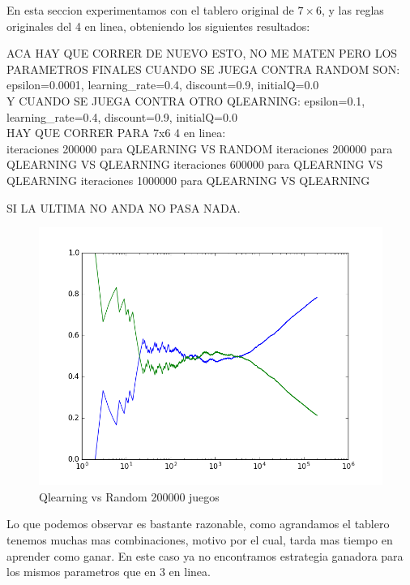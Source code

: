En esta seccion experimentamos con el tablero original de $7\times6$, y las reglas originales del 4 en linea, obteniendo los siguientes resultados:\\

{\large ACA HAY QUE CORRER DE NUEVO ESTO, NO ME MATEN PERO LOS PARAMETROS FINALES 
CUANDO SE JUEGA CONTRA RANDOM SON: \\
epsilon=0.0001, learning\_rate=0.4, discount=0.9, initialQ=0.0 \\
Y CUANDO SE JUEGA CONTRA OTRO QLEARNING:
epsilon=0.1, learning\_rate=0.4, discount=0.9, initialQ=0.0 \\

HAY QUE CORRER PARA 7x6 4 en linea: \\
iteraciones 200000 para QLEARNING VS RANDOM
iteraciones 200000 para QLEARNING VS QLEARNING
iteraciones 600000 para QLEARNING VS QLEARNING
iteraciones 1000000 para QLEARNING VS QLEARNING

SI LA ULTIMA NO ANDA NO PASA NADA. 

}


\begin{figure}[h]
 \centering
  \begin{minipage}[c]{1\textwidth}
	\centering
	\includegraphics[scale=0.5]{img/QlearningRandomEgreedy2000007x6(4).png}
        \caption{Qlearning vs Random 200000 juegos}
  \end{minipage}
\end{figure}

Lo que podemos observar es bastante razonable, como agrandamos el tablero tenemos muchas mas combinaciones, motivo por el cual, tarda mas tiempo en aprender como ganar.
En este caso ya no encontramos estrategia ganadora para los mismos parametros que en 3 en linea.

